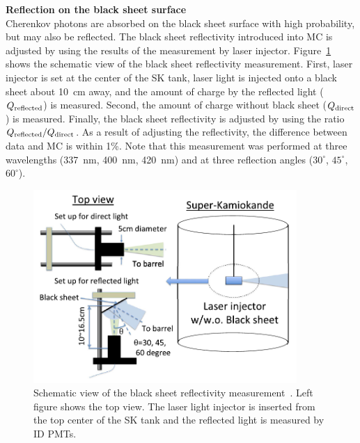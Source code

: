 \textbf{Reflection on the black sheet surface}\\
\hs
Cherenkov photons are absorbed on the black sheet surface with high probability, but may also be reflected.
The black sheet reflectivity introduced into MC is adjusted by using the results of the measurement by laser injector.
Figure~\ref{Calibration_CalibBS} shows the schematic view of the black sheet reflectivity measurement.
First, laser injector is set at the center of the SK tank, laser light is injected onto a black sheet about 10~cm away, and the amount of charge by the reflected light ($Q_{\rm reflected}$) is measured.
Second, the amount of charge without black sheet ($Q_{\rm direct}$) is measured.
Finally, the black sheet reflectivity is adjusted by using the ratio $Q_{\rm reflected}/Q_{\rm direct}$.
As a result of adjusting the reflectivity, the difference between data and MC is within 1\%.
Note that this measurement was performed at three wavelengths (337~nm, 400~nm, 420~nm) and at three reflection angles ($30^{\circ}$, $45^{\circ}$, $60^{\circ}$).

\begin{figure}[H]
	\centering
	\includegraphics[width=10cm]{Figures/Calibration/CalibBS}
	\caption[Schematic view of the black sheet reflectivity measurement]{
	Schematic view of the black sheet reflectivity measurement~\cite{2014AbeCalib}.
	Left figure shows the top view.
	The laser light injector is inserted from the top center of the SK tank and the reflected light is measured by ID PMTs.
	}\label{Calibration_CalibBS}
\end{figure}





